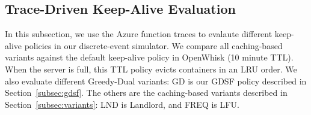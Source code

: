 \subsection{Trace-Driven Keep-Alive Evaluation}
\vspace*{\subsecspace}
In this subsection, we use the Azure function traces to evalaute different keep-alive policies in our discrete-event simulator. 
We compare all caching-based variants against the default keep-alive policy in OpenWhisk (10 minute TTL).
When the server is full, this TTL policy evicts containers in an LRU order.
We also evaluate different Greedy-Dual variants: GD is our GDSF policy described in Section~\ref{subsec:gdsf}.
The others are the caching-based variants described in Section~\ref{subsec:variants}: LND is Landlord, and FREQ is LFU. 


